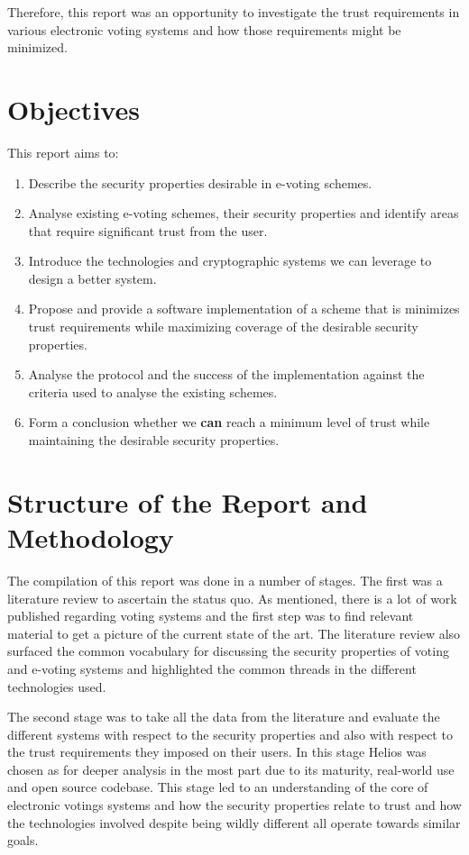 Therefore, this report was an opportunity to investigate the trust requirements in various electronic voting systems and how those requirements might be minimized.


\section{Objectives}
\label{ch:intro:object}

This report aims to:

\begin{enumerate}
    \item Describe the security properties desirable in e-voting schemes.
    \item Analyse existing e-voting schemes, their security properties and identify areas that require significant trust from the user.
    \item Introduce the technologies and cryptographic systems we can leverage to design a better system.
    \item Propose and provide a software implementation of a scheme that is minimizes trust requirements while maximizing coverage of the desirable security properties.
    \item Analyse the protocol and the success of the implementation against the criteria used to analyse the existing schemes.
    \item Form a conclusion whether we {\textbf{can}} reach a minimum level of trust while maintaining the desirable security properties.
\end{enumerate}


\section{Structure of the Report and Methodology}
\label{ch:intro:method}

The compilation of this report was done in a number of stages. The first was a literature review to ascertain the status quo. As mentioned, there is a lot of work published regarding voting systems and the first step was to find relevant material to get a picture of the current state of the art. The literature review also surfaced the common vocabulary for discussing the security properties of voting and e-voting systems and highlighted the common threads in the different technologies used.

The second stage was to take all the data from the literature and evaluate the different systems with respect to the security properties and also with respect to the trust requirements they imposed on their users. In this stage Helios was chosen as for deeper analysis in the most part due to its maturity, real-world use and open source codebase. This stage led to an understanding of the core of electronic votings systems and how the security properties relate to trust and how the technologies involved despite being wildly different all operate towards similar goals.

